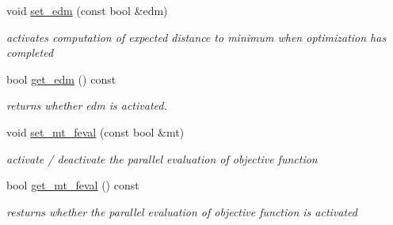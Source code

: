 \begin{DoxyCompactItemize}
void \hyperlink{classlibcmaes_1_1Parameters_ac34068e69a36d06fed6599a7247bcb2e}{set\-\_\-edm} (const bool \&edm)
\begin{DoxyCompactList}\small\item\em activates computation of expected distance to minimum when optimization has completed \end{DoxyCompactList}\item 
bool \hyperlink{classlibcmaes_1_1Parameters_a3fa757be9e734622d77a831b3576aedb}{get\-\_\-edm} () const 
\begin{DoxyCompactList}\small\item\em returns whether edm is activated. \end{DoxyCompactList}\item 
void \hyperlink{classlibcmaes_1_1Parameters_a72995fb64587e6401d8b751343750c65}{set\-\_\-mt\-\_\-feval} (const bool \&mt)
\begin{DoxyCompactList}\small\item\em activate / deactivate the parallel evaluation of objective function \end{DoxyCompactList}\item 
bool \hyperlink{classlibcmaes_1_1Parameters_aac3914b24de6312e6d1fe3d493bb42f5}{get\-\_\-mt\-\_\-feval} () const 
\begin{DoxyCompactList}\small\item\em resturns whether the parallel evaluation of objective function is activated \end{DoxyCompactList}\end{DoxyCompactItemize}
